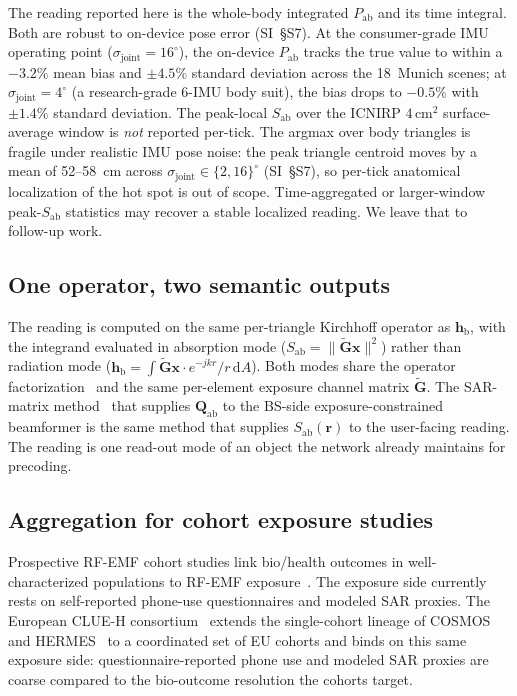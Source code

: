 \documentclass[journal,twocolumn,10pt]{IEEEtran}
\theoremstyle{plain}
\theoremstyle{definition}
\theoremstyle{remark}
\newcommand{\rr}{\mathbf{r}}
\newcommand{\xx}{\mathbf{x}}
\newcommand{\Sab}{S_{\mathrm{ab}}}
\newcommand{\Pabs}{P_{\mathrm{ab}}}
\newcommand{\Qabs}{\mathbf{Q}_{\mathrm{ab}}}
\newcommand{\hbody}{\bm{h}_{\mathrm{b}}}
\begin{document}
The reading reported here is the whole-body integrated $\Pabs$
and its time integral. Both are robust to on-device pose error
(SI~\S{}S7). At the consumer-grade IMU operating point
($\sigma_\mathrm{joint} = 16^{\circ}$), the on-device $\Pabs$
tracks the true value to within a $-3.2\%$ mean bias and
$\pm 4.5\%$ standard deviation across the 18~Munich scenes;
at $\sigma_\mathrm{joint} = 4^{\circ}$ (a research-grade
6-IMU body suit), the bias drops to $-0.5\%$ with
$\pm 1.4\%$ standard deviation. The peak-local $\Sab$ over the ICNIRP
$4\,$cm$^{2}$ surface-average window is \emph{not} reported
per-tick. The argmax over body triangles is fragile under
realistic IMU pose noise: the peak triangle centroid moves by a
mean of 52--58~cm across $\sigma_\mathrm{joint} \in
\{2,16\}^{\circ}$ (SI~\S{}S7), so per-tick anatomical
localization of the hot spot is out of scope. Time-aggregated or
larger-window peak-$\Sab$ statistics may recover a stable
localized reading. We leave that to follow-up work.

\subsection{One operator, two semantic outputs}

The reading is computed on the same per-triangle Kirchhoff
operator as $\hbody$, with the integrand evaluated in absorption
mode ($\Sab = \|\tilde{\bm{G}}\xx\|^{2}$) rather than radiation
mode ($\hbody = \int \tilde{\bm{G}}\xx \cdot e^{-jkr}/r\,\mathrm{d}A$).
Both modes share the operator factorization~ and
the same per-element exposure channel matrix $\tilde{\bm{G}}$.
The SAR-matrix method~\cite{Hochwald2014,Ying2015,Ying2017}
that supplies $\Qabs$ to the BS-side exposure-constrained
beamformer is the same method that supplies $\Sab(\rr)$ to
the user-facing reading. The reading is one read-out mode of an
object the network already maintains for precoding.

\subsection{Aggregation for cohort exposure studies}

Prospective RF-EMF cohort studies link bio/health outcomes in
well-characterized populations to RF-EMF
exposure~\cite{Roosli2010,Roosli2021,vanWel2024}. The exposure
side currently rests on self-reported phone-use questionnaires
and modeled SAR proxies. The European CLUE-H
consortium~\cite{CLUEH2025} extends the single-cohort lineage of
COSMOS~\cite{Roosli2021} and HERMES~\cite{Roosli2010} to a
coordinated set of EU cohorts and binds on this same exposure
side: questionnaire-reported phone use and modeled SAR proxies
are coarse compared to the bio-outcome resolution the cohorts
target.
\end{document}

